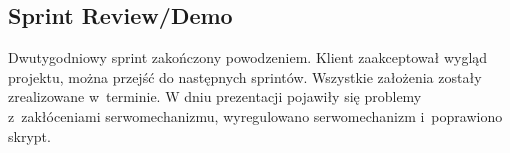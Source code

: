 
\subsection{Sprint Review/Demo}
	Dwutygodniowy sprint zakończony powodzeniem. Klient zaakceptował wygląd projektu, można przejść do następnych sprintów. Wszystkie założenia zostały zrealizowane w~terminie. W dniu prezentacji pojawiły się problemy z~zakłóceniami serwomechanizmu, wyregulowano serwomechanizm i~poprawiono skrypt.